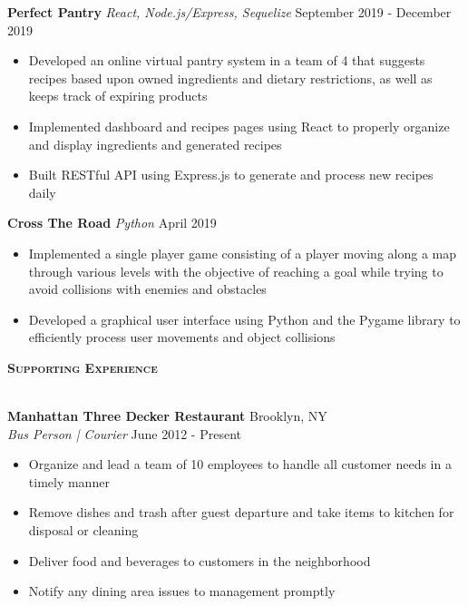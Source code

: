 \documentclass[a4paper]{article}
\newcommand{\lineunder} {
    \vspace*{-8pt} \\
    \hspace*{-18pt} \hrulefill \\
}
\newcommand{\header} [1] {
    {\hspace*{-18pt}\vspace*{6pt} \textsc{#1}}
    \vspace*{-6pt} \lineunder
}
\begin{document}
{\textbf{Perfect Pantry}} {\sl React, Node.js/Express, Sequelize} \hfill September 2019 - December 2019\\
\vspace{-3mm}
\begin{itemize} \itemsep -2pt
	\item Developed an online virtual pantry system in a team of 4 that suggests recipes based upon owned ingredients and dietary restrictions, as well as keeps track of expiring products
    \item Implemented dashboard and recipes pages using React to properly organize and display ingredients and generated recipes
    \item Built RESTful API using Express.js to generate and process new recipes daily
    \end{itemize}

{\textbf{Cross The Road}} {\sl Python} \hfill April 2019\\
\vspace{-3mm}
\begin{itemize} \itemsep -2pt
	\item Implemented a single player game consisting of a player moving along a map through various levels with the objective of reaching a goal while trying to avoid collisions with enemies and obstacles
    \item Developed a graphical user interface using Python and the Pygame library to efficiently process user movements and object collisions
    \end{itemize}


\header{\textbf{Supporting Experience}}
\vspace{1mm}

\textbf{Manhattan Three Decker Restaurant} \hfill Brooklyn, NY\\
\textit{Bus Person | Courier} \hfill June 2012 - Present\\
\vspace{-3mm}
\begin{itemize} \itemsep -3pt
	\item Organize and lead a team of 10 employees to handle all customer needs in a timely manner
	\item Remove dishes and trash after guest departure and take items to kitchen for disposal or cleaning
    \item Deliver food and beverages to customers in the neighborhood
    \item Notify any dining area issues to management promptly
\end{itemize}



\ 
\end{document}

